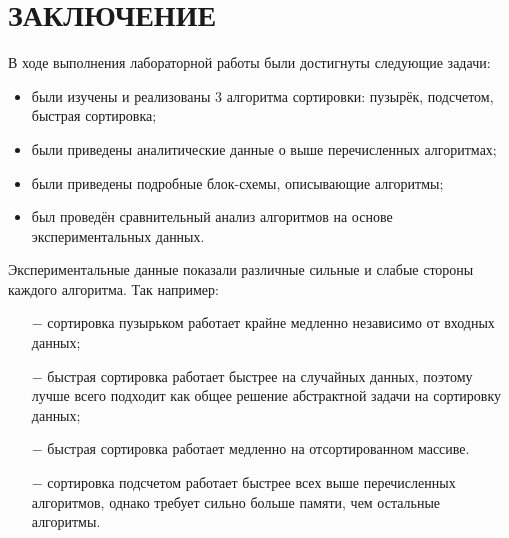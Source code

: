 \chapter{ЗАКЛЮЧЕНИЕ}

В ходе выполнения лабораторной работы были достигнуты следующие задачи:

\begin{itemize}
    \item были изучены и реализованы 3 алгоритма сортировки: пузырёк, подсчетом, быстрая сортировка;
    \item были приведены аналитические данные о выше перечисленных алгоритмах;
    \item были приведены подробные блок-схемы, описывающие алгоритмы;
    \item был проведён сравнительный анализ алгоритмов на основе экспериментальных данных.
\end{itemize}

Экспериментальные данные показали различные сильные и слабые стороны каждого алгоритма.
Так например:
\begin{itemize}
    \item[$-$] сортировка пузырьком работает крайне медленно независимо от входных данных;
    \item[$-$] быстрая сортировка работает быстрее на случайных данных, поэтому лучше всего подходит как общее решение абстрактной задачи на сортировку данных;
    \item[$-$] быстрая сортировка работает медленно на отсортированном массиве.
    \item[$-$] сортировка подсчетом работает быстрее всех выше перечисленных алгоритмов, однако требует сильно больше памяти, чем остальные алгоритмы.
\end{itemize}
